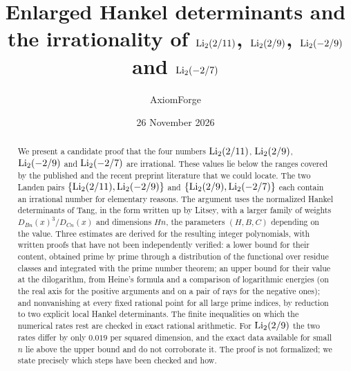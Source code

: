 \documentclass[11pt]{amsart}
\title[Enlarged Hankel determinants and four dilogarithm values]{Enlarged Hankel determinants and the irrationality of $\operatorname{Li}_2(2/11)$, $\operatorname{Li}_2(2/9)$, $\operatorname{Li}_2(-2/9)$ and $\operatorname{Li}_2(-2/7)$}
\author{AxiomForge}
\date{26 November 2026}
\begin{document}
\begin{abstract}
We present a candidate proof that the four numbers $\operatorname{Li}_2(2/11)$, $\operatorname{Li}_2(2/9)$, $\operatorname{Li}_2(-2/9)$ and $\operatorname{Li}_2(-2/7)$ are irrational. These values lie below the ranges covered by the published and the recent preprint literature that we could locate. The two Landen pairs $\{\operatorname{Li}_2(2/11),\operatorname{Li}_2(-2/9)\}$ and $\{\operatorname{Li}_2(2/9),\operatorname{Li}_2(-2/7)\}$ each contain an irrational number for elementary reasons. The argument uses the normalized Hankel determinants of Tang, in the form written up by Litsey, with a larger family of weights $D_{Bn}(x)^3/D_{Cn}(x)$ and dimensions $Hn$, the parameters $(H,B,C)$ depending on the value. Three estimates are derived for the resulting integer polynomials, with written proofs that have not been independently verified: a lower bound for their content, obtained prime by prime through a distribution of the functional over residue classes and integrated with the prime number theorem; an upper bound for their value at the dilogarithm, from Heine's formula and a comparison of logarithmic energies (on the real axis for the positive arguments and on a pair of rays for the negative ones); and nonvanishing at every fixed rational point for all large prime indices, by reduction to two explicit local Hankel determinants. The finite inequalities on which the numerical rates rest are checked in exact rational arithmetic. For $\operatorname{Li}_2(2/9)$ the two rates differ by only $0.019$ per squared dimension, and the exact data available for small $n$ lie above the upper bound and do not corroborate it. The proof is not formalized; we state precisely which steps have been checked and how.
\end{abstract}

\affrontmatter











\appendix




\clearpage




\clearpage


\end{document}
